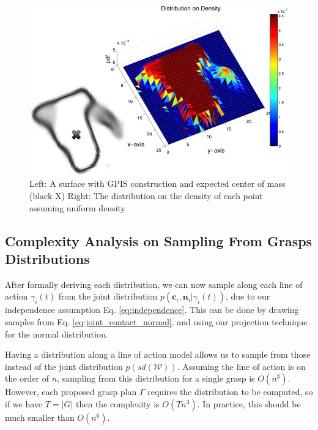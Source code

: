 \documentclass[letterpaper, 10 pt, conference]{ieeeconf}  %
\begin{document}
\begin{figure}[ht!]
\centering
\includegraphics[scale = 0.3]{figures/Slide06.jpg}
\caption{Left: A surface with GPIS construction and expected center of mass (black X)
Right: The distribution on the density of each point assuming uniform density}
\vspace*{-10pt}
\label{fig:GPIS_MASS}
\end{figure}

\subsection{Complexity Analysis on Sampling From Grasps Distributions}

After formally deriving each distribution,  we can now sample along each line of action $\gamma_i(t)$ from the joint distribution $p(\textbf{c}_i,\textbf{n}_i | \gamma_i(t))$, due to our independence assumption Eq. \ref{eq:independence}. This can be done by drawing samples from Eq. \ref{eq:joint_contact_normal}. and using our projection technique for the normal distribution. 

Having a distribution along a line of action model allows us to sample from those instead of the joint distribution $p(sd(\mathcal{W}))$. Assuming the line of action is on the order of $n$, sampling from this distribution for a single grasp is $O(n^3)$. However, each proposed grasp plan $\Gamma$ requires the distribution to be computed, so if we have $T=|G|$ then the complexity is $O(Tn^3)$. In practice, this should be much smaller than $O(n^6)$. 
\end{document}
